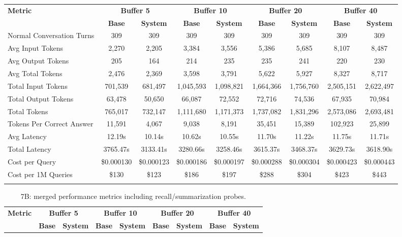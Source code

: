 \documentclass[pdflatex,sn-mathphys-num]{sn-jnl}%
\theoremstyle{thmstyleone}%
\theoremstyle{thmstyletwo}%
\theoremstyle{thmstylethree}%
\begin{document}
\begin{appendices}
\begin{landscape}
\begin{longtable}{@{}p{3.8cm}cccccccc@{}}
\toprule
\textbf{Metric} & \multicolumn{2}{c}{\textbf{Buffer 5}} & \multicolumn{2}{c}{\textbf{Buffer 10}} & \multicolumn{2}{c}{\textbf{Buffer 20}} & \multicolumn{2}{c}{\textbf{Buffer 40}} \\
\cmidrule(lr){2-3}\cmidrule(lr){4-5}\cmidrule(lr){6-7}\cmidrule(lr){8-9}
 & \textbf{Base} & \textbf{System} & \textbf{Base} & \textbf{System} & \textbf{Base} & \textbf{System} & \textbf{Base} & \textbf{System} \\
\midrule
\endhead
Normal Conversation Turns & 309 & 309 & 309 & 309 & 309 & 309 & 309 & 309 \\
Avg Input Tokens & 2,270 & 2,205 & 3,384 & 3,556 & 5,386 & 5,685 & 8,107 & 8,487 \\
Avg Output Tokens & 205 & 164 & 214 & 235 & 235 & 241 & 220 & 230 \\
Avg Total Tokens & 2,476 & 2,369 & 3,598 & 3,791 & 5,622 & 5,927 & 8,327 & 8,717 \\
Total Input Tokens & 701,539 & 681,497 & 1,045,593 & 1,098,821 & 1,664,366 & 1,756,760 & 2,505,151 & 2,622,497 \\
Total Output Tokens & 63,478 & 50,650 & 66,087 & 72,552 & 72,716 & 74,536 & 67,935 & 70,984 \\
Total Tokens & 765,017 & 732,147 & 1,111,680 & 1,171,373 & 1,737,082 & 1,831,296 & 2,573,086 & 2,693,481 \\
Tokens Per Correct Answer & 11,591 & 4,067 & 9,038 & 8,191 & 35,451 & 15,389 & 102,923 & 25,899 \\
Avg Latency & 12.19s & 10.14s & 10.62s & 10.55s & 11.70s & 11.22s & 11.75s & 11.71s \\
Total Latency & 3765.47s & 3133.41s & 3280.66s & 3258.46s & 3615.37s & 3468.37s & 3629.73s & 3618.90s \\
Cost per Query & \$0.000130 & \$0.000123 & \$0.000186 & \$0.000197 & \$0.000288 & \$0.000304 & \$0.000423 & \$0.000443 \\
Cost per 1M Queries & \$130 & \$123 & \$186 & \$197 & \$288 & \$304 & \$423 & \$443 \\
\botrule
\end{longtable}
\normalsize
\end{landscape}
\begin{landscape}
\tiny
\begin{longtable}{@{}p{3.8cm}cccccccc@{}}
\caption{7B: merged performance metrics including recall/summarization probes.}\label{tab:app_7b_perf_probe}\\

\toprule
\textbf{Metric} & \multicolumn{2}{c}{\textbf{Buffer 5}} & \multicolumn{2}{c}{\textbf{Buffer 10}} & \multicolumn{2}{c}{\textbf{Buffer 20}} & \multicolumn{2}{c}{\textbf{Buffer 40}} \\
\cmidrule(lr){2-3}\cmidrule(lr){4-5}\cmidrule(lr){6-7}\cmidrule(lr){8-9}
 & \textbf{Base} & \textbf{System} & \textbf{Base} & \textbf{System} & \textbf{Base} & \textbf{System} & \textbf{Base} & \textbf{System} \\
\midrule
\endfirsthead


\end{longtable}
\end{landscape}
\end{appendices}
\end{document}
